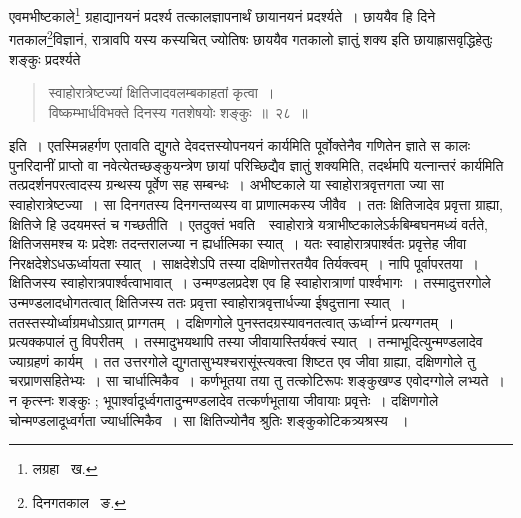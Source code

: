 \documentclass[11pt, openany]{book}
\begin{document}
\indent एवमभीष्टकाले\renewcommand{\thefootnote}{३}\footnote{लग्रहा \textendash\ ख.} ग्रहाद्यानयनं प्रदर्श्य तत्कालज्ञापनार्थं छायानयनं प्रदर्श्यते~। छाययैव हि दिने गतकाल\renewcommand{\thefootnote}{४}\footnote{दिनगतकाल \textendash\ ङ.}विज्ञानं, रात्रावपि यस्य कस्यचित् ज्योतिषः छाययैव गतकालो ज्ञातुं शक्य इति छायाह्रासवृद्धिहेतुः शङ्कुः प्रदर्श्यते\textendash 


\newpage

\begin{quote}
{\ab स्वाहोरात्रेष्टज्यां क्षितिजादवलम्बकाहतां कृत्वा~। \\
 विष्कम्भार्धविभक्ते दिनस्य गतशेषयोः शङ्कुः~॥~२८~॥} 
\end{quote}
 
\indent इति~। एतस्मिन्नहर्गण एतावति द्युगते देवदत्तस्योपनयनं कार्यमिति पूर्वोक्तेनैव गणितेन ज्ञाते स कालः पुनरिदानीं प्राप्तो वा 
नवेत्येतच्छङ्कुयन्त्रेण छायां परिच्छिद्यैव ज्ञातुं शक्यमिति, तदर्थमपि यत्नान्तरं कार्यमिति तत्प्रदर्शनपरत्वादस्य ग्रन्थस्य पूर्वेण सह
सम्बन्धः~। अभीष्टकाले या स्वाहोरात्रवृत्तगता ज्या सा स्वाहोरात्रेष्टज्या~। सा दिनगतस्य दिनगन्तव्यस्य वा प्राणात्मकस्य जीवैव~। ततः क्षितिजादेव प्रवृत्ता ग्राह्या, क्षितिजे हि उदयमस्तं च गच्छतीति~। एतदुक्तं भवति~\textendash\ स्वाहोरात्रे यत्राभीष्टकालेऽर्कबिम्बघनमध्यं वर्तते, क्षितिजसमश्च यः प्रदेशः तदन्तरालज्या न ह्यर्धात्मिका स्यात्~। यतः स्वाहोरात्रपार्श्वतः प्रवृत्तेह जीवा निरक्षदेशेऽधऊर्ध्वायता स्यात्~। साक्षदेशेऽपि तस्या दक्षिणोत्तरतयैव तिर्यक्त्वम्~। नापि पूर्वापरतया~। क्षितिजस्य स्वाहोरात्रपार्श्वत्वाभावात्~। उन्मण्डलप्रदेश एव हि स्वाहोरात्राणां पार्श्वभागः~। 
तस्मादुत्तरगोले उन्मण्डलादधोगतत्वात् क्षितिजस्य ततः प्रवृत्ता स्वाहोरात्रवृत्तार्धज्या ईषदुत्ताना स्यात्~। ततस्तस्योर्ध्वाग्रमधोऽग्रात्
प्राग्गतम्~। दक्षिणगोले पुनस्तदग्रस्यावनतत्वात् ऊर्ध्वाग्नं प्रत्यग्गतम्~। प्रत्यक्कपालं तु विपरीतम्~। तस्मादुभयथापि तस्या जीवायास्तिर्यक्त्वं स्यात्~। तन्माभूदित्युन्मण्डलादेव ज्याग्रहणं कार्यम्~। तत उत्तरगोले द्युगतासुभ्यश्चरासूंस्त्यक्त्वा शिष्टत एव जीवा ग्राह्या, दक्षिणगोले तु चरप्राणसहितेभ्यः~। सा चार्धात्मिकैव~। कर्णभूतया तया तु तत्कोटिरूपः शङ्कुखण्ड एवोदग्गोले लभ्यते~। न कृत्स्नः शङ्कुः ; भूपार्श्वादूर्ध्वगतादुन्मण्डलादेव तत्कर्णभूताया जीवायाः प्रवृत्तेः~। दक्षिणगोले चोन्मण्डलादूध्वर्गता ज्यार्धात्मिकैव~। सा क्षितिज्योनैव श्रुतिः
शङ्कुकोटिकत्र्यश्रस्य ~।

\newpage
\end{document}
